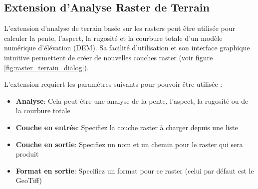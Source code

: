 
\subsection{Extension d'Analyse Raster de Terrain}


L'extension d'analyse de terrain basée sur les rasters peut être utilisée pour calculer la pente, l'aspect, la rugosité et la courbure totale d'un modèle numérique d'élévation (DEM). Sa facilité d'utilisation et son interface graphique intuitive permettent de créer de nouvelles couches raster (voir figure \ref{fig:raster_terrain_dialog}).

L'extension requiert les paramètres suivants pour pouvoir être utilisée :

\begin{itemize}
\item \textbf{Analyse}: Cela peut être une analyse de la pente, l'aspect, la rugosité ou de la courbure totale
\item \textbf{Couche en entrée}: Specifiez la couche raster à charger depuis une liste
\item \textbf{Couche en sortie}: Specifiez un nom et un chemin pour le raster qui sera produit
\item \textbf{Format en sortie}: Specifiez un format pour ce raster (celui par défaut est le GeoTiff)
\end{itemize}

